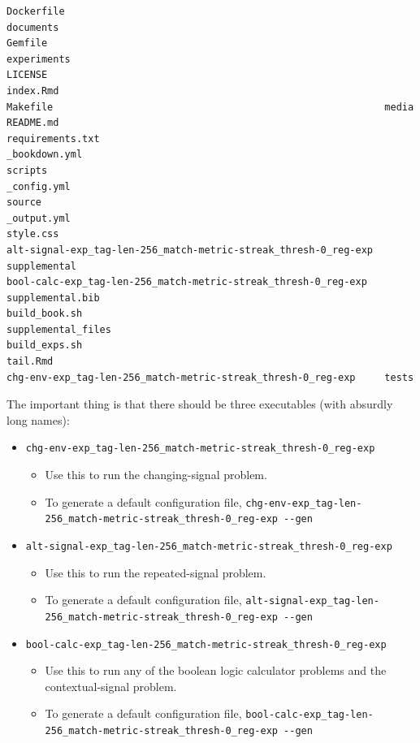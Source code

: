 \documentclass[
]{book}
\providecommand{\tightlist}{%
  \setlength{\itemsep}{0pt}\setlength{\parskip}{0pt}}
\begin{document}
\begin{verbatim}
Dockerfile                                                       documents
Gemfile                                                          experiments
LICENSE                                                          index.Rmd
Makefile                                                         media
README.md                                                        requirements.txt
_bookdown.yml                                                    scripts
_config.yml                                                      source
_output.yml                                                      style.css
alt-signal-exp_tag-len-256_match-metric-streak_thresh-0_reg-exp  supplemental
bool-calc-exp_tag-len-256_match-metric-streak_thresh-0_reg-exp   supplemental.bib
build_book.sh                                                    supplemental_files
build_exps.sh                                                    tail.Rmd
chg-env-exp_tag-len-256_match-metric-streak_thresh-0_reg-exp     tests
\end{verbatim}

The important thing is that there should be three executables (with absurdly long names):

\begin{itemize}
\tightlist
\item
  \texttt{chg-env-exp\_tag-len-256\_match-metric-streak\_thresh-0\_reg-exp}

  \begin{itemize}
  \tightlist
  \item
    Use this to run the changing-signal problem.
  \item
    To generate a default configuration file, \texttt{chg-env-exp\_tag-len-256\_match-metric-streak\_thresh-0\_reg-exp\ -\/-gen}
  \end{itemize}
\item
  \texttt{alt-signal-exp\_tag-len-256\_match-metric-streak\_thresh-0\_reg-exp}

  \begin{itemize}
  \tightlist
  \item
    Use this to run the repeated-signal problem.
  \item
    To generate a default configuration file, \texttt{alt-signal-exp\_tag-len-256\_match-metric-streak\_thresh-0\_reg-exp\ -\/-gen}
  \end{itemize}
\item
  \texttt{bool-calc-exp\_tag-len-256\_match-metric-streak\_thresh-0\_reg-exp}

  \begin{itemize}
  \tightlist
  \item
    Use this to run any of the boolean logic calculator problems and the contextual-signal problem.
  \item
    To generate a default configuration file, \texttt{bool-calc-exp\_tag-len-256\_match-metric-streak\_thresh-0\_reg-exp\ -\/-gen}
  \end{itemize}
\end{itemize}
\end{document}
